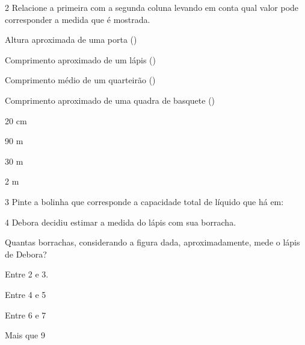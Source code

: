 \num{2} Relacione a primeira com a segunda coluna levando em conta qual
valor pode corresponder a medida que é mostrada.

\begin{multicols}{2}

Altura aproximada de uma porta ()

Comprimento aproximado de um lápis (\coment{20 cm})

Comprimento médio de um quarteirão ()

Comprimento aproximado de uma quadra de basquete ()

\columnbreak

20 cm
 
90 m

30 m
 
2 m
\end{multicols}


\num{3} Pinte a bolinha que corresponde a capacidade total de líquido que
há em:



\num{4} Debora decidiu estimar a medida do lápis com sua borracha.


Quantas borrachas, considerando a figura dada, aproximadamente, mede o
lápis de Debora?

\begin{escolha}
\item
  Entre 2 e 3.
\item
  Entre 4 e 5
\item
  Entre 6 e 7
\item
  Mais que 9
\end{escolha}

